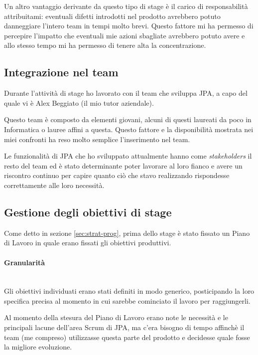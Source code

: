 Un altro vantaggio derivante da questo tipo di stage è il carico di
responsabilità attribuitami: eventuali difetti introdotti nel prodotto
avrebbero potuto danneggiare l'intero team in tempi molto brevi. Questo
fattore mi ha permesso di percepire l'impatto che eventuali mie azioni
sbagliate avrebbero potuto avere e allo stesso tempo mi ha permesso di tenere
alta la concentrazione.

\subsection{Integrazione nel team}
Durante l'attività di stage ho lavorato con il team che sviluppa JPA, a capo
del quale vi è Alex Beggiato (il mio tutor aziendale).

Questo team è composto da elementi giovani, alcuni di questi laureati da poco
in Informatica o lauree affini a questa. Questo fattore e la disponibilità
mostrata nei miei confronti ha reso molto semplice l'inserimento nel team.

Le funzionalità di JPA che ho sviluppato attualmente hanno come
\emph{stakeholders} il resto del team ed è stato determinante poter lavorare
al loro fianco e avere un riscontro continuo per capire quanto ciò che stavo
realizzando rispondesse correttamente alle loro necessità.

\subsection{Gestione degli obiettivi di stage}\label{sec:visione-gestione-ob}

Come detto in sezione \ref{sec:strat-prog}, prima dello stage è stato fissato
un Piano di Lavoro in quale erano fissati gli obiettivi produttivi.

\paragraph{Granularità} \mbox{} \\

Gli obiettivi individuati erano stati definiti in modo generico, posticipando
la loro specifica precisa al momento in cui sarebbe cominciato il lavoro per
raggiungerli.

Al momento della stesura del Piano di Lavoro erano note le necessità e le
principali lacune dell'area Scrum di JPA, ma c'era bisogno di tempo affinchè
il team (me compreso) utilizzasse questa parte del prodotto e decidesse quale
fosse la migliore evoluzione.

